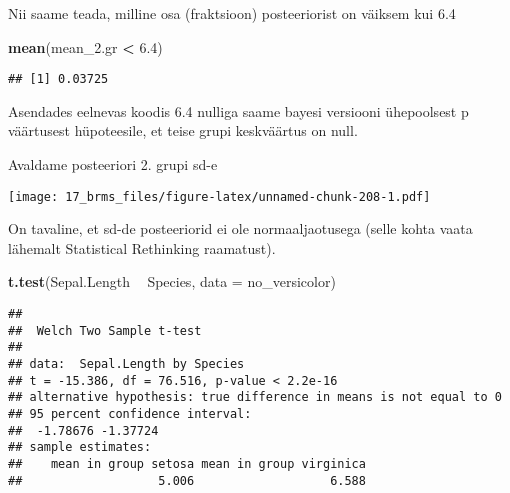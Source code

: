 \documentclass[]{article}
\newenvironment{Shaded}{\begin{snugshade}}{\end{snugshade}}
\newcommand{\KeywordTok}[1]{\textcolor[rgb]{0.13,0.29,0.53}{\textbf{#1}}}
\newcommand{\DataTypeTok}[1]{\textcolor[rgb]{0.13,0.29,0.53}{#1}}
\newcommand{\FloatTok}[1]{\textcolor[rgb]{0.00,0.00,0.81}{#1}}
\newcommand{\StringTok}[1]{\textcolor[rgb]{0.31,0.60,0.02}{#1}}
\newcommand{\OtherTok}[1]{\textcolor[rgb]{0.56,0.35,0.01}{#1}}
\newcommand{\OperatorTok}[1]{\textcolor[rgb]{0.81,0.36,0.00}{\textbf{#1}}}
\newcommand{\NormalTok}[1]{#1}
\begin{document}
Nii saame teada, milline osa (fraktsioon) posteeriorist on väiksem kui
6.4

\begin{Shaded}
\begin{Highlighting}[]
\KeywordTok{mean}\NormalTok{(mean_}\FloatTok{2.}\NormalTok{gr }\OperatorTok{<}\StringTok{ }\FloatTok{6.4}\NormalTok{)}
\end{Highlighting}
\end{Shaded}

\begin{verbatim}
## [1] 0.03725
\end{verbatim}

Asendades eelnevas koodis 6.4 nulliga saame bayesi versiooni ühepoolsest
p väärtusest hüpoteesile, et teise grupi keskväärtus on null.

Avaldame posteeriori 2. grupi sd-e

\begin{Shaded}
\end{Shaded}

\texttt{[image: 17\_brms\_files/figure-latex/unnamed-chunk-208-1.pdf]}

On tavaline, et sd-de posteeriorid ei ole normaaljaotusega (selle kohta
vaata lähemalt Statistical Rethinking raamatust).

\begin{Shaded}
\begin{Highlighting}[]
\KeywordTok{t.test}\NormalTok{(Sepal.Length }\OperatorTok{~}\StringTok{ }\NormalTok{Species, }\DataTypeTok{data =}\NormalTok{ no_versicolor)}
\end{Highlighting}
\end{Shaded}

\begin{verbatim}
## 
##  Welch Two Sample t-test
## 
## data:  Sepal.Length by Species
## t = -15.386, df = 76.516, p-value < 2.2e-16
## alternative hypothesis: true difference in means is not equal to 0
## 95 percent confidence interval:
##  -1.78676 -1.37724
## sample estimates:
##    mean in group setosa mean in group virginica 
##                   5.006                   6.588
\end{verbatim}
\end{document}
